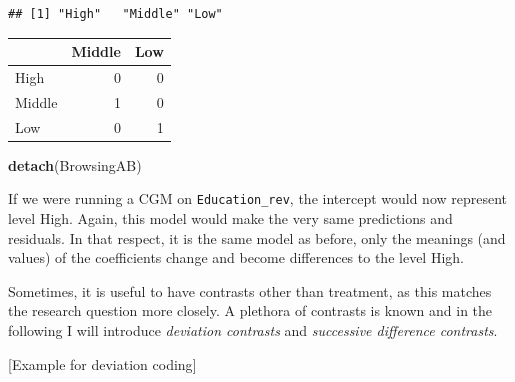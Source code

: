 \documentclass[]{svmono}
\newenvironment{Shaded}{\begin{snugshade}}{\end{snugshade}}
\newcommand{\KeywordTok}[1]{\textcolor[rgb]{0.13,0.29,0.53}{\textbf{#1}}}
\newcommand{\StringTok}[1]{\textcolor[rgb]{0.31,0.60,0.02}{#1}}
\newcommand{\OperatorTok}[1]{\textcolor[rgb]{0.81,0.36,0.00}{\textbf{#1}}}
\newcommand{\NormalTok}[1]{#1}
\begin{document}
\begin{verbatim}
## [1] "High"   "Middle" "Low"
\end{verbatim}

\begin{Shaded}
\end{Shaded}

\begin{tabular}{l|r|r}
\hline
  & Middle & Low\\
\hline
High & 0 & 0\\
\hline
Middle & 1 & 0\\
\hline
Low & 0 & 1\\
\hline
\end{tabular}

\begin{Shaded}
\begin{Highlighting}[]
\KeywordTok{detach}\NormalTok{(BrowsingAB)}
\end{Highlighting}
\end{Shaded}

If we were running a CGM on \texttt{Education\_rev}, the intercept would
now represent level High. Again, this model would make the very same
predictions and residuals. In that respect, it is the same model as
before, only the meanings (and values) of the coefficients change and
become differences to the level High.

Sometimes, it is useful to have contrasts other than treatment, as this
matches the research question more closely. A plethora of contrasts is
known and in the following I will introduce \emph{deviation contrasts}
and \emph{successive difference contrasts}.

{[}Example for deviation coding{]}
\end{document}
